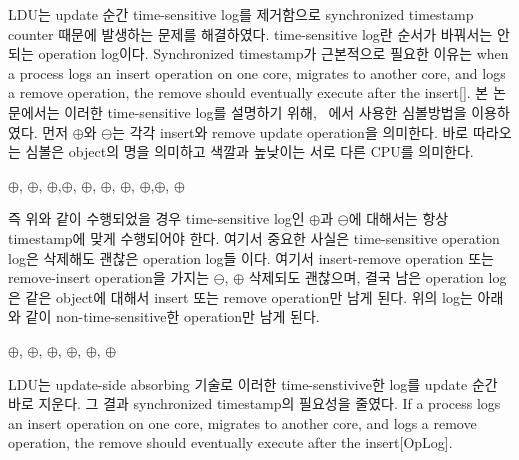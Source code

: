 \ifkor
LDU는 update 순간 time-sensitive log를 제거함으로 synchronized timestamp counter 때문에 발생하는
문제를 해결하였다.
time-sensitive log란 순서가 바꿔서는 안되는 operation log이다. 
Synchronized timestamp가 근본적으로 필요한 이유는 when a process logs an insert
operation on one core, migrates to another core, and logs a remove operation, the remove should
eventually execute after the insert[]. 
본 논문에서는 이러한 time-sensitive log를 설명하기 위해, ~\cite{Clements15SCR}에서 사용한 심볼방법을
이용하였다.
먼저 $\oplus$와 $\ominus$는 각각 insert와 remove update operation을 의미한다.
바로 따라오는 심볼은 object의 명을 의미하고 색깔과 높낮이는 서로 다른 CPU를 의미한다.
\begin{center}
$\oplus$, $\oplus$, $\oplus$,$\oplus$,
$\oplus$, $\oplus$, $\oplus$,
$\oplus$,$\oplus$, $\oplus$
\end{center}
즉 위와 같이 수행되었을 경우 time-sensitive log인 $\oplus$과 $\ominus$에
대해서는 항상 timestamp에 맞게 수행되어야 한다.
여기서 중요한 사실은 time-sensitive operation log은 삭제해도 괜찮은 operation log들 이다.
여기서 insert-remove operation 또는 remove-insert operation을 가지는 
$\ominus$, $\oplus$ 삭제되도 괜찮으며, 결국 남은 operation log은 같은
object에 대해서 insert 또는 remove operation만 남게 된다.
위의 log는 아래와 같이 non-time-sensitive한 operation만 남게 된다.
\begin{center}
$\oplus$, $\oplus$, $\oplus$,
$\oplus$, $\oplus$, $\oplus$
\end{center}
LDU는 update-side absorbing 기술로 이러한 time-senstivive한 log를 update 순간 바로
지운다.
그 결과 synchronized timestamp의 필요성을 줄였다.
\else
If a process logs an insert operation on one core,
migrates to another core, and logs a remove operation, the remove should
eventually execute after the insert[OpLog].
\fi


